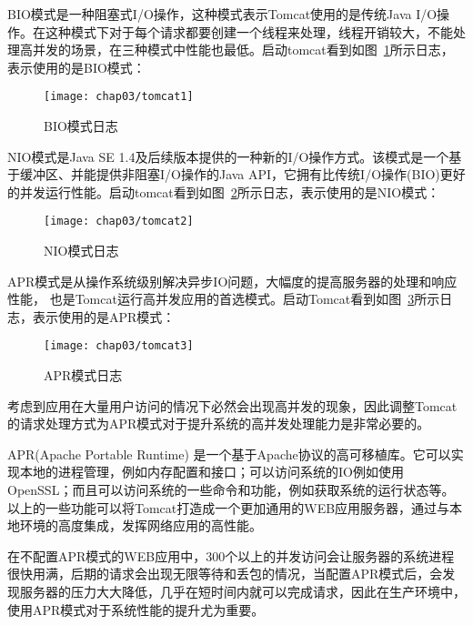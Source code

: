 BIO模式是一种阻塞式I/O操作，这种模式表示Tomcat使用的是传统Java I/O操作。在这种模式下对于每个请求都要创建一个线程来处理，线程开销较大，不能处理高并发的场景，在三种模式中性能也最低。启动tomcat看到如图~\ref{fig:tomcat1}所示日志，表示使用的是BIO模式：
\begin{figure}[H] %
  \centering
  \texttt{[image: chap03/tomcat1]}
  \caption{BIO模式日志}
  \label{fig:tomcat1}
\end{figure}
NIO模式是Java SE 1.4及后续版本提供的一种新的I/O操作方式。该模式是一个基于缓冲区、并能提供非阻塞I/O操作的Java API，它拥有比传统I/O操作(BIO)更好的并发运行性能。启动tomcat看到如图~\ref{fig:tomcat2}所示日志，表示使用的是NIO模式：
\begin{figure}[H] %
  \centering
  \texttt{[image: chap03/tomcat2]}
  \caption{NIO模式日志}
  \label{fig:tomcat2}
\end{figure}
APR模式是从操作系统级别解决异步IO问题，大幅度的提高服务器的处理和响应性能， 也是Tomcat运行高并发应用的首选模式。启动Tomcat看到如图~\ref{fig:tomcat3}所示日志，表示使用的是APR模式：
\begin{figure}[H] %
  \centering
  \texttt{[image: chap03/tomcat3]}
  \caption{APR模式日志}
  \label{fig:tomcat3}
\end{figure}
考虑到应用在大量用户访问的情况下必然会出现高并发的现象，因此调整Tomcat的请求处理方式为APR模式对于提升系统的高并发处理能力是非常必要的\cite{蒋文旭2012大型高并发}。

APR(Apache Portable Runtime) 是一个基于Apache协议的高可移植库。它可以实现本地的进程管理，例如内存配置和接口；可以访问系统的IO例如使用OpenSSL；而且可以访问系统的一些命令和功能，例如获取系统的运行状态等。以上的一些功能可以将Tomcat打造成一个更加通用的WEB应用服务器，通过与本地环境的高度集成，发挥网络应用的高性能\cite{Tomcat性能调优}。

在不配置APR模式的WEB应用中，300个以上的并发访问会让服务器的系统进程很快用满，后期的请求会出现无限等待和丢包的情况，当配置APR模式后，会发现服务器的压力大大降低\cite{vukotic2011embedding}，几乎在短时间内就可以完成请求，因此在生产环境中，使用APR模式对于系统性能的提升尤为重要。
